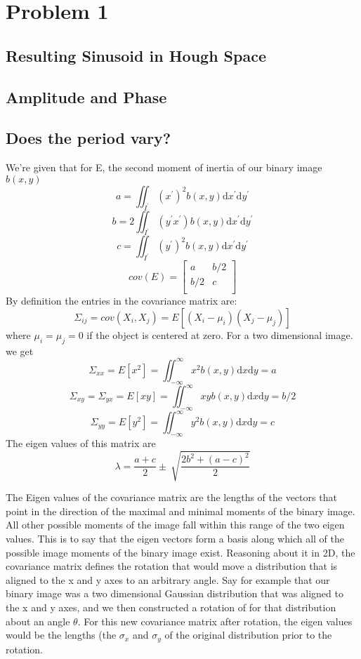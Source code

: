 \documentclass{article}
\begin{document}
\section{Problem 1}
\subsection{Resulting Sinusoid in Hough Space}
\subsection{Amplitude and Phase}
\subsection{Does the period vary?}

We're given that for E, the second moment of inertia of our binary image $b(x,y)$
\begin{equation}
a=\iint_{I^{\prime}} (x^{\prime})^{2}b(x,y)\mathrm{d}x^{\prime} \mathrm{d}y^{\prime}
\end{equation}
\begin{equation}
b=2\iint_{I^{\prime}} (y^{\prime}x^{\prime})b(x,y)\mathrm{d}x^{\prime} \mathrm{d}y^{\prime}
\end{equation}
\begin{equation}
c=\iint_{I^{\prime}} (y^{\prime})^{2}b(x,y)\mathrm{d}x^{\prime} \mathrm{d}y^{\prime}
\end{equation}
\[cov(E)=
 \begin{bmatrix}
  a & b/2 \\
  b/2 & c \\
 \end{bmatrix}
\]
By definition the entries in the covariance matrix are:
\[
\Sigma_{ij}= cov(X_i,X_j)=E[(X_i-\mu_i)(X_j-\mu_j)]
\]
where $\mu_i=\mu_j=0$ if the object is centered at zero. For a two dimensional image. we get
\[
\Sigma_{xx}=E[x^2]=\iint_{-\infty}^\infty x^2b(x,y)\mathrm{d}x\mathrm{d}y=a
\]
\[
\Sigma_{xy}=\Sigma_{yx}=E[xy]=\iint_{-\infty}^\infty xyb(x,y)\mathrm{d}x\mathrm{d}y=b/2
\]
\[
\Sigma_{yy}=E[y^2]=\iint_{-\infty}^\infty y^2b(x,y)\mathrm{d}x\mathrm{d}y=c
\]
The eigen values of this matrix are
\[
\lambda = \frac{a+c}{2}\pm\ \sqrt{\frac{2b^2 + (a-c)^2}{2}}
\]

The Eigen values of the covariance matrix are the lengths of the vectors that point in the direction of the maximal and minimal moments of the binary image. All other possible moments of the image fall within this range of the two eigen values. This is to say that the eigen vectors form a basis along which all of the possible image moments of the binary image exist. Reasoning about it in 2D, the covariance matrix defines the rotation that would move a distribution that is aligned to the x and y axes to an arbitrary angle. Say for example that our binary image was a two dimensional Gaussian distribution that was aligned to the x and y axes, and we then constructed a rotation of for that distribution about an angle $\theta$. For this new covariance matrix after rotation, the eigen values would be the lengths (the $\sigma_{x}$ and $\sigma_y$ of the original distribution prior to the rotation. 
\end{document}

